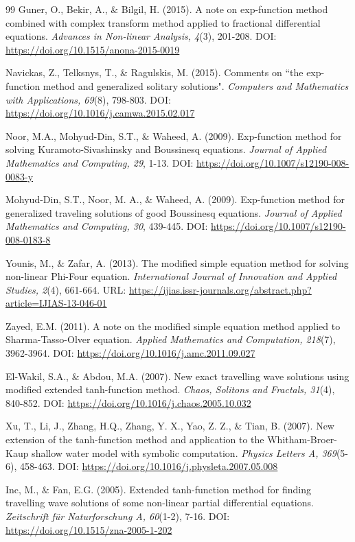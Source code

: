 \documentclass[10pt]{NSP1}
\numberwithin{equation}{section}
\begin{document}
\begin{thebibliography}{99}
 Guner, O., Bekir, A., ${\&}$ Bilgil, H. (2015). A note on exp-function method combined with complex transform method applied to fractional differential equations. \emph{Advances in Non-linear Analysis, 4}(3), 201-208. DOI: \url{https://doi.org/10.1515/anona-2015-0019}

 Navickas, Z., Telksnys, T., ${\&}$ Ragulskis, M. (2015). Comments on ``the exp-function method and generalized solitary solutions". \emph{Computers and Mathematics with Applications, 69}(8), 798-803. DOI: \url{https://doi.org/10.1016/j.camwa.2015.02.017}

 Noor, M.A., Mohyud-Din, S.T., ${\&}$ Waheed, A. (2009). Exp-function method for solving Kuramoto-Sivashinsky and Boussinesq equations. \emph{Journal of Applied Mathematics and Computing, 29}, 1-13. DOI: \url{https://doi.org/10.1007/s12190-008-0083-y}

 Mohyud-Din, S.T., Noor, M. A., ${\&}$ Waheed, A. (2009). Exp-function method for generalized traveling solutions of good Boussinesq equations. \emph{Journal of Applied Mathematics and Computing, 30}, 439-445. DOI: \url{https://doi.org/10.1007/s12190-008-0183-8}

 Younis, M., ${\&}$ Zafar, A. (2013). The modified simple equation method for solving non-linear Phi-Four equation. \emph{International Journal of Innovation and Applied Studies, 2}(4), 661-664. URL: \url{https://ijias.issr-journals.org/abstract.php?article=IJIAS-13-046-01}

 Zayed, E.M. (2011). A note on the modified simple equation method applied to Sharma-Tasso-Olver equation. \emph{Applied Mathematics and Computation, 218}(7), 3962-3964. DOI: \url{https://doi.org/10.1016/j.amc.2011.09.027}

 El-Wakil, S.A., ${\&}$ Abdou, M.A. (2007). New exact travelling wave solutions using modified extended tanh-function method. \emph{Chaos, Solitons and Fractals, 31}(4), 840-852. DOI: \url{https://doi.org/10.1016/j.chaos.2005.10.032}

 Xu, T., Li, J., Zhang, H.Q., Zhang, Y. X., Yao, Z. Z., ${\&}$ Tian, B. (2007). New extension of the tanh-function method and application to the Whitham-Broer-Kaup shallow water model with symbolic computation. \emph{Physics Letters A, 369}(5-6), 458-463. DOI: \url{https://doi.org/10.1016/j.physleta.2007.05.008}

 Inc, M., ${\&}$ Fan, E.G. (2005). Extended tanh-function method for finding travelling wave solutions of some non-linear partial differential equations. \emph{Zeitschrift f\"{u}r Naturforschung A, 60}(1-2), 7-16. DOI: \url{https://doi.org/10.1515/zna-2005-1-202}


\end{thebibliography}
\end{document}
